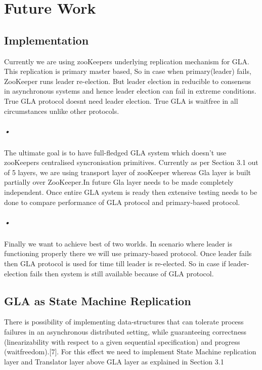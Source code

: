 \documentclass[a4paper,12pt]{report}
\begin{document}
\newpage
\chapter{Future Work}             %
\section{Implementation}
Currently we are using zooKeepers underlying replication mechanism for GLA. This replication is primary master based, So in case when primary(leader) fails, ZooKeeper runs leader re-election. But leader election in reducible to consensus in asynchronous systems and hence leader election can fail in extreme conditions. True GLA protocol doesnt need leader election. True GLA is waitfree in all circumstances unlike other protocols.
\paragraph{•}
The ultimate goal is to have full-fledged GLA system which doesn't use zooKeepers centralised syncronisation primitives. Currently as per Section 3.1 out of 5 layers, we are using transport layer of zooKeeper whereas Gla layer is built partially over ZooKeeper.In future Gla layer needs to be made completely independent. Once entire GLA system is ready then extensive testing needs to be done to compare performance of GLA protocol and primary-based protocol.
\paragraph{•}
Finally we want to achieve best of two worlds. In scenario where leader is functioning properly there we will use primary-based protocol. Once leader fails then GLA protocol is used for time till leader is re-elected. So in case if leader-election fails then system is still available because of GLA protocol. 

\section{GLA as State Machine Replication}
There is possibility of implementing data-structures that can
tolerate process failures in an asynchronous distributed setting,
while guaranteeing correctness (linearizability with respect
 to a given sequential specification) and progress (waitfreedom).[7].
 For this effect we need to implement State Machine replication layer and Translator layer above GLA layer as explained in Section 3.1
\end{document}
